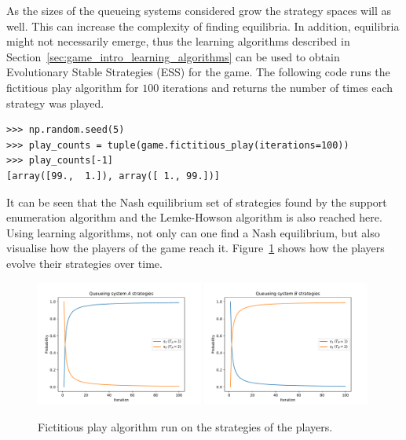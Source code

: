 As the sizes of the queueing systems considered grow the strategy spaces will
as well.
This can increase the complexity of finding equilibria.
In addition, equilibria might not necessarily emerge, thus the learning
algorithms described in Section~\ref{sec:game_intro_learning_algorithms} can be
used to obtain Evolutionary Stable Strategies (ESS) for the game.
The following code runs the fictitious play algorithm for \(100\) iterations
and returns the number of times each strategy was played.

\begin{lstlisting}[style=pystyle]
>>> np.random.seed(5)
>>> play_counts = tuple(game.fictitious_play(iterations=100))
>>> play_counts[-1]
[array([99.,  1.]), array([ 1., 99.])]

\end{lstlisting}

It can be seen that the Nash equilibrium set of strategies found by the
support enumeration algorithm and the Lemke-Howson algorithm is also reached
here.
Using learning algorithms, not only can one find a Nash equilibrium,
but also visualise how the players of the game reach it.
Figure~\ref{fig:solving_game_fictitious_example} shows how the players evolve
their strategies over time.

\begin{figure}[H]
    \centering
    \includegraphics[width=0.49\textwidth]{chapters/04_game_theoretic_model/Bin/numeric_results/fictitious_play_A.pdf}
    \includegraphics[width=0.49\textwidth]{chapters/04_game_theoretic_model/Bin/numeric_results/fictitious_play_B.pdf}
    \caption{Fictitious play algorithm run on the strategies of the players.}
    \label{fig:solving_game_fictitious_example}
\end{figure}

